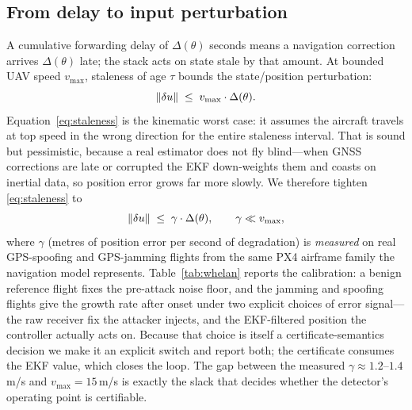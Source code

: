 \subsection{From delay to input perturbation}
A cumulative forwarding delay of $\Delta(\theta)$ seconds means a navigation
correction arrives $\Delta(\theta)$ late; the stack acts on state stale by that
amount. At bounded UAV speed $v_{\max}$, staleness of age $\tau$ bounds the
state/position perturbation:
\begin{equation}
\label{eq:staleness}
\left\lVert \delta u\right\rVert \;\le\; v_{\max}\cdot \Delta(\theta).
\end{equation}
Equation~\eqref{eq:staleness} is the kinematic worst case: it assumes the
aircraft travels at top speed in the wrong direction for the entire staleness
interval. That is sound but pessimistic, because a real estimator does not fly
blind---when GNSS corrections are late or corrupted the EKF down-weights them
and coasts on inertial data, so position error grows far more slowly. We
therefore tighten \eqref{eq:staleness} to
\begin{equation}
\label{eq:gamma}
\left\lVert \delta u\right\rVert\;\le\;\gamma\cdot\Delta(\theta),\qquad \gamma\ll v_{\max},
\end{equation}
where $\gamma$ (metres of position error per second of degradation) is
\emph{measured} on real GPS-spoofing and GPS-jamming flights from the same PX4
airframe family the navigation model represents. Table~\ref{tab:whelan} reports
the calibration: a benign reference flight fixes the pre-attack noise floor, and
the jamming and spoofing flights give the growth rate after onset under two
explicit choices of error signal---the raw receiver fix the attacker injects,
and the EKF-filtered position the controller actually acts on. Because that
choice is itself a certificate-semantics decision we make it an explicit switch
and report both; the certificate consumes the EKF value, which closes the loop.
The gap between the measured $\gamma\approx1.2$--$1.4$\,m/s and
$v_{\max}=15$\,m/s is exactly the slack that decides whether the detector's
operating point is certifiable.


